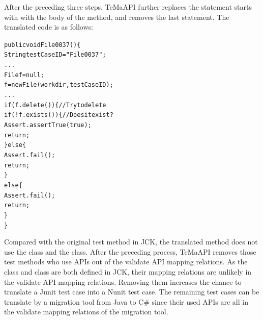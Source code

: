 After the preceding three steps, TeMaAPI further replaces the statement starts with  with the body of the  method, and removes the last statement. The translated code is as follows:

\begin{CodeOut}%
\begin{alltt}
  public void File0037()\{
    String testCaseID = "File0037";
    ...   
    File f = null;
    f = new File(workdir, testCaseID);
    ...
    if (f.delete()) \{ // Try to delete
      if (!f.exists()) \{ // Does it exist?
        Assert.assertTrue(true);
        return;
     \}else\{
        Assert.fail();
        return;
     \}
   else\{
       Assert.fail();
       return;
   \}   
  \}
\end{alltt}
\end{CodeOut}

Compared with the original test method in JCK, the translated method does not use the  class and the  class. After the preceding process, TeMaAPI removes those test methods who use APIs out of the validate API mapping relations. As the  class and  class are both defined in JCK, their mapping relations are unlikely in the validate API mapping relations. Removing them increases the chance to translate a Junit test case into a Nunit test case. The remaining test cases can be translate by a migration tool from Java to C\# since their used APIs are all in the validate mapping relations of the migration tool.